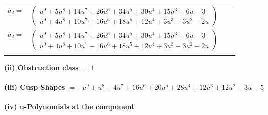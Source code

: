 \documentclass[1p]{elsarticle_modified}
\theoremstyle{definition}
\begin{document}
\begin{tabular}{m{7pt} m{180pt} m{7pt} m{180pt} }
\flushright $a_{2}=$&$\begin{pmatrix}u^9+5 u^8+14 u^7+26 u^6+34 u^5+30 u^4+15 u^3-6 u-3\\u^9+4 u^8+10 u^7+16 u^6+18 u^5+12 u^4+3 u^3-3 u^2-2 u\end{pmatrix}$\\ \flushright $a_{2}=$&$\begin{pmatrix}u^9+5 u^8+14 u^7+26 u^6+34 u^5+30 u^4+15 u^3-6 u-3\\u^9+4 u^8+10 u^7+16 u^6+18 u^5+12 u^4+3 u^3-3 u^2-2 u\end{pmatrix}$\\&\end{tabular}
\flushleft \textbf{(ii) Obstruction class $= 1$}\\~\\
\flushleft \textbf{(iii) Cusp Shapes $= - u^9+u^8+4 u^7+16 u^6+20 u^5+28 u^4+12 u^3+12 u^2-3 u-5$}\\~\\
\newpage\renewcommand{\arraystretch}{1}
\flushleft \textbf{(iv) u-Polynomials at the component}\newline \\
\end{document}
